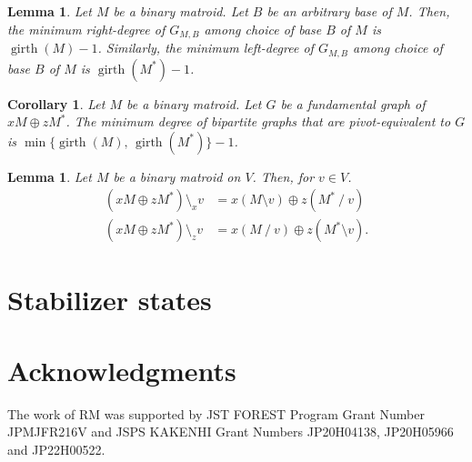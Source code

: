 \documentclass[twoside,10pt]{article}
\DeclareMathOperator{\girth}{girth}
\newtheorem{lemma}[theorem]{Lemma}
\newtheorem{corollary}[theorem]{Corollary}
\theoremstyle{definition}
\theoremstyle{remark}
\begin{document}
\begin{lemma}
Let $M$ be a binary matroid.
Let $B$ be an arbitrary base of $M$.
Then, the minimum right-degree of $G_{M,B}$ among choice of base $B$ of $M$ is $\girth(M)-1$.
Similarly, the minimum left-degree of $G_{M,B}$ among choice of base $B$ of $M$ is $\girth(M^*)-1$.
\end{lemma}

\begin{corollary}
Let $M$ be a binary matroid.
Let $G$ be a fundamental graph of $xM\oplus zM^*$.
The minimum degree of bipartite graphs that are pivot-equivalent to $G$ is $\min\{\girth(M),\,\girth(M^*)\}-1$.
\end{corollary}


\begin{lemma}
Let $M$ be a binary matroid on $V$.
Then, for $v\in V$.
\begin{align*}
(xM\oplus zM^*)\setminus_x v &= x(M\setminus v) \oplus z (M^* \mathbin{/} v)\\
(xM\oplus zM^*)\setminus_z v &= x(M\mathbin{/} v) \oplus z (M^* \setminus v).
\end{align*}
\end{lemma}

\section{Stabilizer states}

\section*{Acknowledgments}
The work of RM was supported by JST FOREST Program Grant Number JPMJFR216V and JSPS KAKENHI Grant Numbers JP20H04138, JP20H05966 and JP22H00522.




\end{document}
